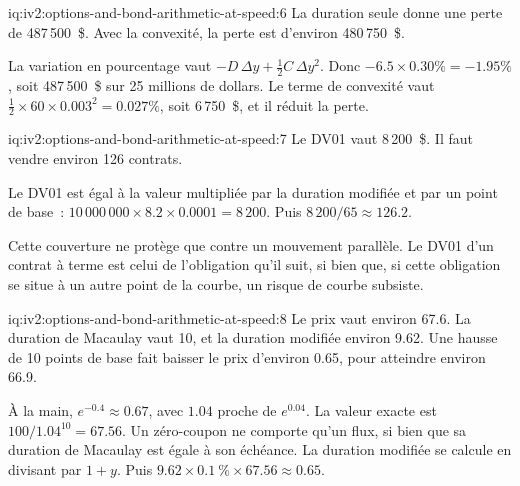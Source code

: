 \begin{solution}{iq:iv2:options-and-bond-arithmetic-at-speed:6}
La duration seule donne une perte de 487\,500~\$. Avec la convexité, la perte est d'environ 480\,750~\$.

La variation en pourcentage vaut $-D\,\Delta y + \tfrac12 C\,\Delta y^2$. Donc $-6.5 \times 0.30\% = -1.95\%$, soit 487\,500~\$ sur 25 millions de dollars. Le terme de convexité vaut $\tfrac12 \times 60 \times 0.003^2 = 0.027\%$, soit 6\,750~\$, et il réduit la perte.

\end{solution}

\begin{solution}{iq:iv2:options-and-bond-arithmetic-at-speed:7}
Le DV01 vaut 8\,200~\$. Il faut vendre environ 126 contrats.

Le DV01 est égal à la valeur multipliée par la duration modifiée et par un point de base~: $10\,000\,000 \times 8.2 \times 0.0001 = 8\,200$. Puis $8\,200/65 \approx 126.2$.

Cette couverture ne protège que contre un mouvement parallèle. Le DV01 d'un contrat à terme est celui de l'obligation qu'il suit, si bien que, si cette obligation se situe à un autre point de la courbe, un risque de courbe subsiste.

\end{solution}

\begin{solution}{iq:iv2:options-and-bond-arithmetic-at-speed:8}
Le prix vaut environ 67.6. La duration de Macaulay vaut 10, et la duration modifiée environ 9.62. Une hausse de 10 points de base fait baisser le prix d'environ 0.65, pour atteindre environ 66.9.

À la main, $e^{-0.4} \approx 0.67$, avec $1.04$ proche de $e^{0.04}$. La valeur exacte est $100/1.04^{10} = 67.56$. Un zéro-coupon ne comporte qu'un flux, si bien que sa duration de Macaulay est égale à son échéance. La duration modifiée se calcule en divisant par $1 + y$. Puis $9.62 \times 0.1~\% \times 67.56 \approx 0.65$.

\end{solution}

